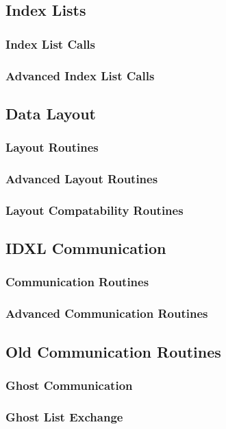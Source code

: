 
\subsection{Index Lists}
\label{sec:IDXL}

\subsubsection{Index List Calls}

\subsubsection{Advanced Index List Calls}

\subsection{Data Layout}

\subsubsection{Layout Routines}

\subsubsection{Advanced Layout Routines}
\label{sec:IDXLLayoutoffset}

\subsubsection{Layout Compatability Routines}


\subsection{IDXL Communication}
\label{sec:IDXLComm}

\subsubsection{Communication Routines}

\subsubsection{Advanced Communication Routines}

\subsection{Old Communication Routines}

\subsubsection{Ghost Communication}

\subsubsection{Ghost List Exchange}

